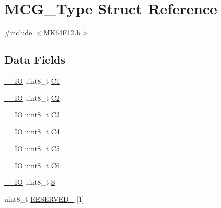 \hypertarget{struct_m_c_g___type}{}\section{M\+C\+G\+\_\+\+Type Struct Reference}
\label{struct_m_c_g___type}


{\ttfamily \#include $<$M\+K64\+F12.\+h$>$}

\subsection*{Data Fields}
\begin{DoxyCompactItemize}
\item 
\mbox{\hyperlink{core__cm4_8h_aec43007d9998a0a0e01faede4133d6be}{\+\_\+\+\_\+\+IO}} uint8\+\_\+t \mbox{\hyperlink{group___v_r_e_f___peripheral___access___layer_gad54aa92be9fc988e74d55d2d3daae8ad}{C1}}
\item 
\mbox{\hyperlink{core__cm4_8h_aec43007d9998a0a0e01faede4133d6be}{\+\_\+\+\_\+\+IO}} uint8\+\_\+t \mbox{\hyperlink{group___v_r_e_f___peripheral___access___layer_ga4f920936a8fc32483b3ebd9b0674b450}{C2}}
\item 
\mbox{\hyperlink{core__cm4_8h_aec43007d9998a0a0e01faede4133d6be}{\+\_\+\+\_\+\+IO}} uint8\+\_\+t \mbox{\hyperlink{group___v_r_e_f___peripheral___access___layer_ga6533a725e5ee4892879f0b6d9dd6675a}{C3}}
\item 
\mbox{\hyperlink{core__cm4_8h_aec43007d9998a0a0e01faede4133d6be}{\+\_\+\+\_\+\+IO}} uint8\+\_\+t \mbox{\hyperlink{group___v_r_e_f___peripheral___access___layer_gadb3f29cb83f573e65eb091a7a79e2e43}{C4}}
\item 
\mbox{\hyperlink{core__cm4_8h_aec43007d9998a0a0e01faede4133d6be}{\+\_\+\+\_\+\+IO}} uint8\+\_\+t \mbox{\hyperlink{group___v_r_e_f___peripheral___access___layer_ga5c3e6553034f7993105ebde9d573236b}{C5}}
\item 
\mbox{\hyperlink{core__cm4_8h_aec43007d9998a0a0e01faede4133d6be}{\+\_\+\+\_\+\+IO}} uint8\+\_\+t \mbox{\hyperlink{group___v_r_e_f___peripheral___access___layer_gaf5f7dd7e0de054a868809b27a17e4207}{C6}}
\item 
\mbox{\hyperlink{core__cm4_8h_aec43007d9998a0a0e01faede4133d6be}{\+\_\+\+\_\+\+IO}} uint8\+\_\+t \mbox{\hyperlink{group___v_r_e_f___peripheral___access___layer_ga0542ffc7618a0893938748eef9c87474}{S}}
\item 
uint8\+\_\+t \mbox{\hyperlink{group___v_r_e_f___peripheral___access___layer_ga4be6979b69000068ac5203085d425825}{R\+E\+S\+E\+R\+V\+E\+D\+\_}} \mbox{[}1\mbox{]}

\end{DoxyCompactItemize}
